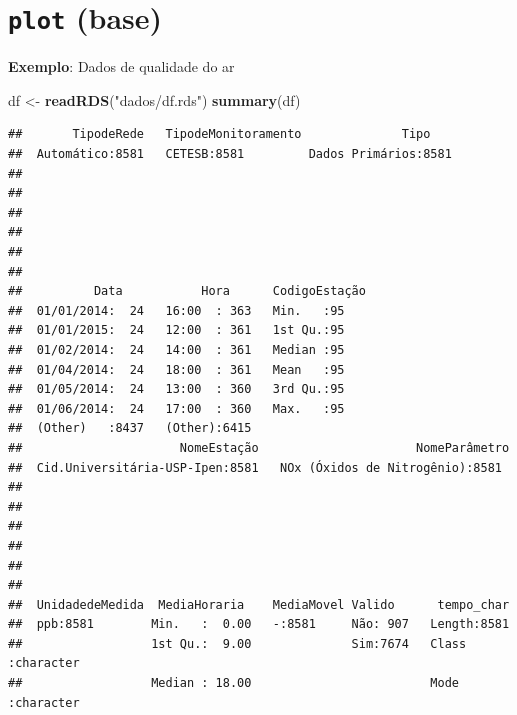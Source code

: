 \documentclass[]{book}
\newenvironment{Shaded}{\begin{snugshade}}{\end{snugshade}}
\newcommand{\KeywordTok}[1]{\textcolor[rgb]{0.13,0.29,0.53}{\textbf{#1}}}
\newcommand{\StringTok}[1]{\textcolor[rgb]{0.31,0.60,0.02}{#1}}
\newcommand{\NormalTok}[1]{#1}
\theoremstyle{definition}
\theoremstyle{definition}
\theoremstyle{definition}
\theoremstyle{remark}
\begin{document}
\section{\texorpdfstring{\texttt{plot}
(base)}{plot (base)}}\label{plot-base}

\textbf{Exemplo}: Dados de qualidade do ar

\begin{Shaded}
\begin{Highlighting}[]
\NormalTok{df <-}\StringTok{ }\KeywordTok{readRDS}\NormalTok{(}\StringTok{"dados/df.rds"}\NormalTok{)}
\KeywordTok{summary}\NormalTok{(df)}
\end{Highlighting}
\end{Shaded}

\begin{verbatim}
##       TipodeRede   TipodeMonitoramento              Tipo     
##  Automático:8581   CETESB:8581         Dados Primários:8581  
##                                                              
##                                                              
##                                                              
##                                                              
##                                                              
##                                                              
##          Data           Hora      CodigoEstação
##  01/01/2014:  24   16:00  : 363   Min.   :95   
##  01/01/2015:  24   12:00  : 361   1st Qu.:95   
##  01/02/2014:  24   14:00  : 361   Median :95   
##  01/04/2014:  24   18:00  : 361   Mean   :95   
##  01/05/2014:  24   13:00  : 360   3rd Qu.:95   
##  01/06/2014:  24   17:00  : 360   Max.   :95   
##  (Other)   :8437   (Other):6415                
##                      NomeEstação                      NomeParâmetro 
##  Cid.Universitária-USP-Ipen:8581   NOx (Óxidos de Nitrogênio):8581  
##                                                                     
##                                                                     
##                                                                     
##                                                                     
##                                                                     
##                                                                     
##  UnidadedeMedida  MediaHoraria    MediaMovel Valido      tempo_char       
##  ppb:8581        Min.   :  0.00   -:8581     Não: 907   Length:8581       
##                  1st Qu.:  9.00              Sim:7674   Class :character  
##                  Median : 18.00                         Mode  :character  

\end{verbatim}
\end{document}
